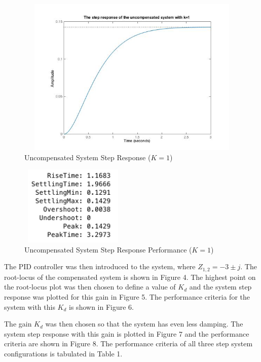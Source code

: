 \documentclass[12pt]{article}
\begin{document}
\begin{figure}[h!] %
   \centering
   \includegraphics[width=5in,height=3in]{uncompensated_sys_time_resp.jpg} 
   \caption{Uncompensated System Step Response ($K=1$)}
   \label{fig:example}
\end{figure}

\newpage

\begin{figure}[h!] %
   \centering
   \includegraphics[width=2in,height=1.5in]{uncompensated_sys_step_info.jpg} 
   \caption{Uncompensated System Step Response Performance ($K=1$)}
   \label{fig:example}
\end{figure}

\bigskip

 The PID controller was then introduced to the system, where $Z_{1,2} = -3 \pm j$. The root-locus of the compensated system is shown in Figure 4. The highest point on the root-locus plot was then chosen to define a value of $K_{d}$ and the system step response was plotted for this gain in Figure 5. The performance criteria for the system with this $K_{d}$ is shown in Figure 6.
\bigskip
 
The gain $K_{d}$ was then chosen so that the system has even less damping. The system step response with this gain is plotted in Figure 7 and the performance criteria are shown in Figure 8. The performance criteria of all three step system configurations is tabulated in Table 1. 
\bigskip
\end{document}
